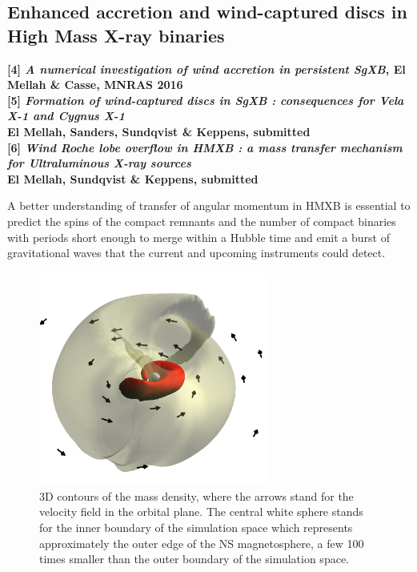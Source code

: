 \documentclass[letterpaper,12pt,onecolumn]{article}
\makeatletter
\newcommand*{\hmxb}{HMXB\@\xspace}
\newcommand*{\ns}{NS\@\xspace}
\makeatother
\begin{document}
\subsection*{Enhanced accretion and wind-captured discs in High Mass X-ray binaries}

\footnotesize
\textbf{[4] \textit{A numerical investigation of wind accretion in persistent SgXB}, El Mellah \& Casse, MNRAS 2016}\\
\textbf{[5] \textit{Formation of wind-captured discs in SgXB : consequences for Vela X-1 and Cygnus X-1}}\\
\hspace*{16pt}\textbf{El Mellah, Sanders, Sundqvist \& Keppens, submitted}\\
\textbf{[6] \textit{Wind Roche lobe overflow in HMXB : a mass transfer mechanism for Ultraluminous X-ray sources}}\\
\hspace*{16pt}\textbf{El Mellah, Sundqvist \& Keppens, submitted}\\

\normalsize

A better understanding of transfer of angular momentum in \hmxb is essential to predict the spins of the compact remnants and the number of compact binaries with periods short enough to merge within a Hubble time and emit a burst of gravitational waves that the current and upcoming instruments could detect.

\begin{figure}
  \centering
  \includegraphics[width=3in]{Figures/disc.png}
  \caption{3D contours of the mass density, where the arrows stand for the velocity field in the orbital plane. The central white sphere stands for the inner boundary of the simulation space which represents approximately the outer edge of the \ns magnetosphere, a few 100 times smaller than the outer boundary of the simulation space.}
  \vspace{-10pt}
\label{fig:disc}
\end{figure}
\end{document}
